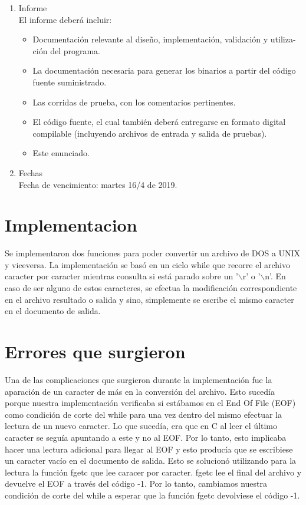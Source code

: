\documentclass[a4paper,11pt]{article}
\begin{document}
\begin{enumerate}
\item Informe \\
El informe deberá incluir:

\begin{itemize}
\item Documentación relevante al diseño, implementación, validación y utiliza-
ción del programa.

\item La documentación necesaria para generar los binarios a partir del código
fuente suministrado.

\item Las corridas de prueba, con los comentarios pertinentes.

\item El código fuente, el cual también deberá entregarse en formato digital compilable (incluyendo archivos de entrada y salida de pruebas).

\item Este enunciado.
\end{itemize}

\item Fechas \\
Fecha de vencimiento: martes 16/4 de 2019.

\end{enumerate}

\newpage

\section{Implementacion}
Se implementaron dos funciones para poder convertir un archivo de DOS a UNIX y viceversa. La implementaci\'on se basó en un ciclo while que recorre el archivo caracter por caracter mientras consulta si está parado sobre un '$\backslash$r' o '$\backslash$n'. En caso de ser alguno de estos caracteres, se efectua la modificación correspondiente en el archivo resultado o salida y sino, simplemente se escribe el mismo caracter en el documento de salida.


\section{Errores que surgieron}
Una de las complicaciones que surgieron durante la implementación fue la aparación de un caracter de más en la conversi\'on del archivo. Esto sucedía porque nuestra implementación verificaba si estábamos en el End Of File (EOF) como condición de corte del while para una vez dentro del mismo efectuar la lectura de un nuevo caracter. Lo que suced\'ia, era que en C al leer el \'ultimo caracter se segu\'ia apuntando a este y no al EOF. Por lo tanto, esto implicaba hacer una lectura adicional para llegar al EOF y esto produc\'ia que se escribiese un caracter vac\'io en el documento de salida. Esto se solucion\'o utilizando para la lectura la funci\'on fgetc que lee caracer por caracter. fgetc lee el final del archivo y devuelve el EOF a trav\'es del c\'odigo -1. Por lo tanto, cambiamos nuestra condici\'on de corte del while a esperar que la funci\'on fgetc devolviese el c\'odigo -1.
\end{document}
